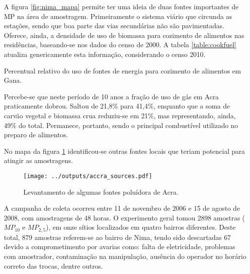 A figura \ref{fig:nima_mapa} permite ter uma ideia de duas fontes importantes de 
MP na área de amostragem. Primeiramente o sistema viário que circunda as 
estações, sendo que boa parte das vias secundárias não são pavimentadas. 
Oferece, ainda, a densidade de uso de biomassa para cozimento de alimentos 
nas residências, baseando-se nos dados do censo de 2000. A tabela 
\ref{table:cookfuel} atualiza genericamente esta informação, considerando o 
censo 2010.

\begin{table}[H]
	\centering
	
	\caption{Percentual relativo do uso de fontes de energia para cozimento 
                 de alimentos em Gana. \citep{ghanacensus2013} \label{table:cookfuel}}
\end{table}

Percebe-se que neste período de 10 anos a fração de uso de gás em Acra 
praticamente dobrou. Saltou de 21,8\% para 41,4\%, enquanto que a soma de carvão
vegetal e biomassa crua reduziu-se em 21\%, mas representando, ainda, 49\% do 
total. Permanece, portanto, sendo o principal combustível utilizado no preparo 
de alimentos.

No mapa da figura \ref{fg:acrasources} identificou-se outras fontes locais que teriam potencial para atingir as amostragens.


\begin{figure}[H]
  \centering	
  \texttt{[image: ../outputs/accra\_sources.pdf]}
  \caption{Levantamento de algumas fontes poluídora de Acra.
           \label{fg:acrasources}}
\end{figure}

A campanha de coleta ocorreu entre 11 de novembro de 2006 e 15 de agosto de 
2008, com amostragens de 48 horas. O experimento geral tomou 2898 amostras 
($MP_{10}$ e $MP_{2,5}$), em onze sítios localizados em quatro bairros diferentes. 
Deste total, 879 amostras referem-se ao bairro de Nima, tendo sido descartadas 67
devido a comprometimento por avarias como: falta de eletricidade, problemas com 
amostrador, contaminação na manipulação, ausência do operador no horário 
correto das trocas, dentre outros.

%    

